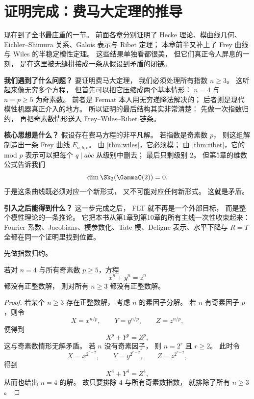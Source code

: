 \section{证明完成：费马大定理的推导}
\label{sec:ch10-proof}

\providecommand{\rhobar}{\bar{\rho}}

现在到了全书最庄重的一节。
前面各章分别证明了 Hecke 理论、模曲线几何、Eichler--Shimura 关系、Galois 表示与 Ribet 定理；
本章前半又补上了 Frey 曲线与 Wiles 的半稳定模性定理。
这些结果单独看都很美，
但它们真正令人屏息的一刻，
是在这里被无缝拼接成一条从假设到矛盾的闭链。

\textbf{我们遇到了什么问题？}
要证明费马大定理，
我们必须处理所有指数 $n\ge 3$。
这听起来像无穷多个方程，
但首先可以把它压缩成两个基本情形：
$n=4$ 与 $n=p\ge 5$ 为奇素数。
前者是 Fermat 本人用无穷递降法解决的；
后者则是现代模性机器真正介入的地方。
所以证明的最后结构其实非常清楚：
先做一次指数归约，
再把奇素数情形送入 Frey--Wiles--Ribet 链条。

\textbf{核心思想是什么？}
假设存在费马方程的非平凡解。
若指数是奇素数 $p$，
则这组解制造出一条 Frey 曲线 $E_{a,b,c}$。
由 \cref{thm:wiles}，它必须模；
由 \cref{thm:ribet}，它的 mod $p$ 表示可以把每个 $q\mid abc$ 从级别中删去；
最后只剩级别 $2$。
但第5章的维数公式告诉我们
\[
  \dim \Sk_2(\GammaO(2))=0.
\]
于是这条曲线既必须对应一个新形式，
又不可能对应任何新形式。
这就是矛盾。

\textbf{引入之后能得到什么？}
这一步完成之后，
FLT 就不再是一个外部目标，
而是整个模性理论的一条推论。
它把本书从第1章到第10章的所有主线一次性收束起来：
Fourier 系数、Jacobians、模参数化、Tate 模、Deligne 表示、水平下降与 $R=T$ 全都在同一个证明里找到位置。



先做指数归约。

\begin{lemma}
\label{lem:ch10-reduction}
若对 $n=4$ 与所有奇素数 $p\ge 5$，方程
\[
  x^n+y^n=z^n
\]
都没有正整数解，
则对所有 $n\ge 3$ 都没有正整数解。
\end{lemma}

\begin{proof}
若某个 $n\ge 3$ 存在正整数解，
考虑 $n$ 的素因子分解。
若 $n$ 有奇素因子 $p$，则令
\[
  X=x^{n/p},\qquad Y=y^{n/p},\qquad Z=z^{n/p},
\]
便得到
\[
  X^p+Y^p=Z^p,
\]
这与奇素数情形无解矛盾。
若 $n$ 没有奇素因子，
则 $n=2^r$ 且 $r\ge 2$。
此时令
\[
  X=x^{2^{r-2}},\qquad Y=y^{2^{r-2}},\qquad Z=z^{2^{r-2}},
\]
得到
\[
  X^4+Y^4=Z^4,
\]
从而也给出 $n=4$ 的解。
故只要排除 $4$ 与所有奇素数指数，
就排除了所有 $n\ge 3$。
\end{proof}

